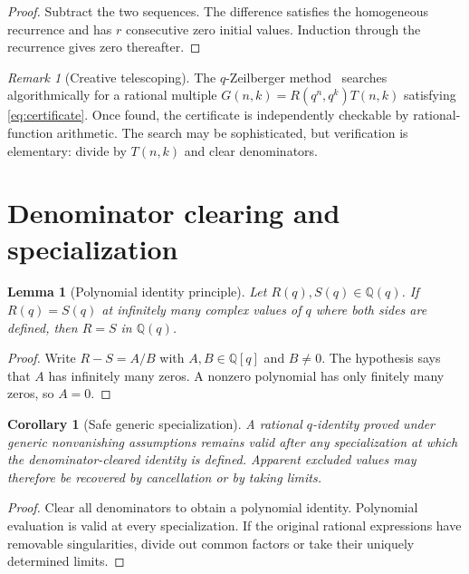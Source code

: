 \documentclass[11pt,oneside,openany]{book}
\newtheorem{lemma}[lemma]{Lemma}
\newtheorem{corollary}[corollary]{Corollary}
\theoremstyle{definition}
\theoremstyle{remark}
\newtheorem{remark}[remark]{Remark}
\newcommand{\Q}{\mathbb Q}
\begin{document}
\begin{proof}
Subtract the two sequences.  The difference satisfies the homogeneous recurrence and has $r$ consecutive zero initial values.  Induction through the recurrence gives zero thereafter.
\end{proof}

\begin{remark}[Creative telescoping]
The $q$-Zeilberger method~\cite{PetkovsekWilfZeilberger1996} searches algorithmically for a rational multiple $G(n,k)=R(q^n,q^k)T(n,k)$ satisfying \eqref{eq:certificate}.  Once found, the certificate is independently checkable by rational-function arithmetic.  The search may be sophisticated, but verification is elementary: divide by $T(n,k)$ and clear denominators.
\end{remark}

\section{Denominator clearing and specialization}

\begin{lemma}[Polynomial identity principle]\label{lem:polynomial-identity-principle}
Let $R(q),S(q)\in\Q(q)$.  If $R(q)=S(q)$ at infinitely many complex values of $q$ where both sides are defined, then $R=S$ in $\Q(q)$.
\end{lemma}

\begin{proof}
Write $R-S=A/B$ with $A,B\in\Q[q]$ and $B\ne0$.  The hypothesis says that $A$ has infinitely many zeros.  A nonzero polynomial has only finitely many zeros, so $A=0$.
\end{proof}

\begin{corollary}[Safe generic specialization]\label{cor:safe-specialization}
A rational $q$-identity proved under generic nonvanishing assumptions remains valid after any specialization at which the denominator-cleared identity is defined.  Apparent excluded values may therefore be recovered by cancellation or by taking limits.
\end{corollary}

\begin{proof}
Clear all denominators to obtain a polynomial identity.  Polynomial evaluation is valid at every specialization.  If the original rational expressions have removable singularities, divide out common factors or take their uniquely determined limits.
\end{proof}
\end{document}
